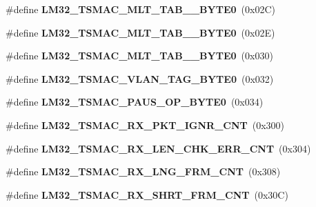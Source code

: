 \begin{DoxyCompactItemize}
\item 
\mbox{\label{group__lm32__tsmac_ga4f9c25ab780921200a626cb1fcdb7fef}} 
\#define {\bfseries L\+M32\+\_\+\+T\+S\+M\+A\+C\+\_\+\+M\+L\+T\+\_\+\+T\+A\+B\+\_\+\_\+\+B\+Y\+T\+E0}~(0x02\+C)
\item 
\mbox{\label{group__lm32__tsmac_ga014e9a1016f988b9978a93b404d5961e}} 
\#define {\bfseries L\+M32\+\_\+\+T\+S\+M\+A\+C\+\_\+\+M\+L\+T\+\_\+\+T\+A\+B\+\_\+\_\+\+B\+Y\+T\+E0}~(0x02\+E)
\item 
\mbox{\label{group__lm32__tsmac_ga49c626571add8670055f645c2b0880ff}} 
\#define {\bfseries L\+M32\+\_\+\+T\+S\+M\+A\+C\+\_\+\+M\+L\+T\+\_\+\+T\+A\+B\+\_\+\_\+\+B\+Y\+T\+E0}~(0x030)
\item 
\mbox{\label{group__lm32__tsmac_gaa54e7e9549ab50a7f59feca478bd8e4b}} 
\#define {\bfseries L\+M32\+\_\+\+T\+S\+M\+A\+C\+\_\+\+V\+L\+A\+N\+\_\+\+T\+A\+G\+\_\+\+B\+Y\+T\+E0}~(0x032)
\item 
\mbox{\label{group__lm32__tsmac_ga1903edd62132a15cdc8d44ec9845f2a0}} 
\#define {\bfseries L\+M32\+\_\+\+T\+S\+M\+A\+C\+\_\+\+P\+A\+U\+S\+\_\+\+O\+P\+\_\+\+B\+Y\+T\+E0}~(0x034)
\item 
\mbox{\label{group__lm32__tsmac_gacbf54bc8ce0ff3b6c8d46aa16a2cf656}} 
\#define {\bfseries L\+M32\+\_\+\+T\+S\+M\+A\+C\+\_\+\+R\+X\+\_\+\+P\+K\+T\+\_\+\+I\+G\+N\+R\+\_\+\+C\+NT}~(0x300)
\item 
\mbox{\label{group__lm32__tsmac_ga9aeaaa32f9d989be82f831da08a792f6}} 
\#define {\bfseries L\+M32\+\_\+\+T\+S\+M\+A\+C\+\_\+\+R\+X\+\_\+\+L\+E\+N\+\_\+\+C\+H\+K\+\_\+\+E\+R\+R\+\_\+\+C\+NT}~(0x304)
\item 
\mbox{\label{group__lm32__tsmac_gad527d7b3a110c60593fd6d3ef3b3d958}} 
\#define {\bfseries L\+M32\+\_\+\+T\+S\+M\+A\+C\+\_\+\+R\+X\+\_\+\+L\+N\+G\+\_\+\+F\+R\+M\+\_\+\+C\+NT}~(0x308)
\item 
\mbox{\label{group__lm32__tsmac_gae6062379062c9430b722c09282ddb704}} 
\#define {\bfseries L\+M32\+\_\+\+T\+S\+M\+A\+C\+\_\+\+R\+X\+\_\+\+S\+H\+R\+T\+\_\+\+F\+R\+M\+\_\+\+C\+NT}~(0x30\+C)

\end{DoxyCompactItemize}
